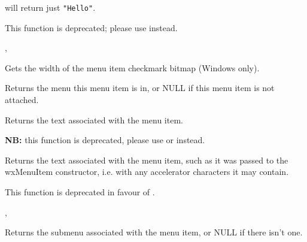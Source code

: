 will return just {\tt "Hello"}.

This function is deprecated; please use  instead.


, 

\label{wxmenuitemgetmarginwidth}


Gets the width of the menu item checkmark bitmap (Windows only).


\label{wxmenuitemgetmenu}


Returns the menu this menu item is in, or NULL if this menu item is not attached.


\label{wxmenuitemgetname}


Returns the text associated with the menu item.

{\bf NB:} this function is deprecated, please use 
 or  
instead.


\label{wxmenuitemgettext}


Returns the text associated with the menu item, such as it was passed to the
wxMenuItem constructor, i.e. with any accelerator characters it may contain.

This function is deprecated in favour of .


, 


\label{wxmenuitemgetsubmenu}


Returns the submenu associated with the menu item, or NULL if there isn't one.


\label{wxmenuitemgettextcolour}

